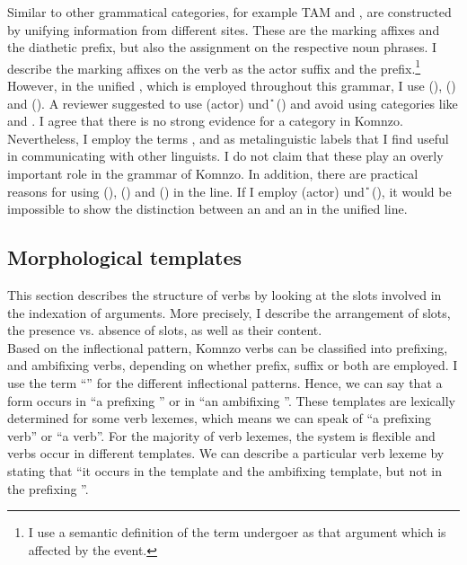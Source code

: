 Similar to other grammatical categories, for example TAM and ,  are constructed by unifying information from different sites. These are the  marking affixes and the diathetic prefix, but also the  assignment on the respective noun phrases. I describe the  marking affixes on the verb as the actor suffix and the  prefix.\footnote{I use a semantic definition of the term undergoer as that argument which is affected by the event.} However, in the unified , which is employed throughout this grammar, I use \Sbj{} (), \Obj{} () and \Io{} (). A reviewer suggested to use \A{} (actor) und \U{} () and avoid using categories like  and . I agree that there is no strong evidence for a  category in Komnzo. Nevertheless, I employ the terms ,  and  as metalinguistic labels that I find useful in communicating with other linguists. I do not claim that these play an overly important role in the grammar of Komnzo. In addition, there are practical reasons for using \Sbj{} (), \Obj{} () and \Io{} () in the  line. If I employ \A{} (actor) und \U{} (), it would be impossible to show the distinction between an  and an  in the unified  line.

\subsection{Morphological templates}\label{morphologicaltemplates}

This section describes the structure of verbs by looking at the slots involved in the indexation of arguments. More precisely, I describe the arrangement of slots, the presence vs. absence of slots, as well as their content.\\

Based on the inflectional pattern, Komnzo verbs can be classified into prefixing,  and ambifixing verbs, depending on whether prefix, suffix or both are employed. I use the term ``'' for the different inflectional patterns. Hence, we can say that a  form occurs in ``a prefixing '' or in ``an ambifixing ''. These templates are lexically determined for some verb lexemes, which means we can speak of ``a prefixing verb'' or ``a  verb''. For the majority of verb lexemes, the system is flexible and verbs occur in different templates. We can describe a particular verb lexeme by stating that ``it occurs in the  template and the ambifixing template, but not in the prefixing ''.\\

